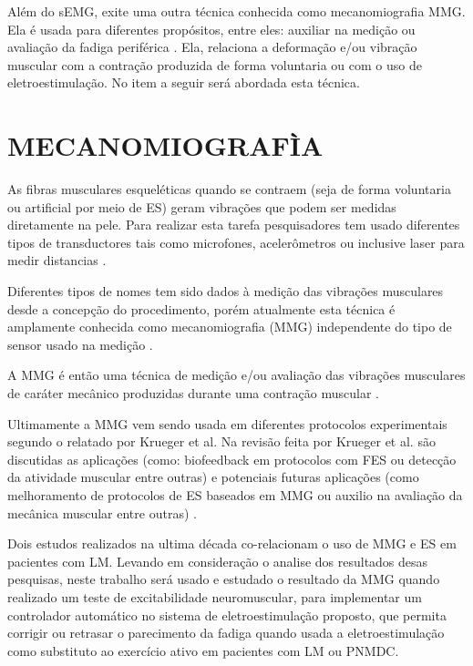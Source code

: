 Além do \acrshort{sEMG}, exite uma outra técnica conhecida como mecanomiografia \acrshort{MMG}. Ela é usada para diferentes propósitos, entre eles: auxiliar na medição ou avaliação da fadiga periférica \cite{Tarata2003MechanomyographyFatigue.}. Ela, relaciona a deformação e/ou vibração muscular com a contração produzida de forma voluntaria ou com o uso de eletroestimulação. No item a seguir será abordada esta técnica. 


\section{MECANOMIOGRAFÌA}
As fibras musculares esqueléticas quando se contraem (seja de forma voluntaria ou artificial por meio de \acrshort{ES}) geram vibrações que podem ser medidas diretamente na pele. Para realizar esta tarefa pesquisadores tem usado diferentes tipos de transductores tais como microfones, acelerômetros ou inclusive laser para medir distancias \cite{Akataki1999RelationshipDecomposition}. 

Diferentes tipos de nomes tem sido dados à medição das vibrações musculares desde a concepção do procedimento, porém atualmente esta técnica é amplamente conhecida como mecanomiografia (\acrshort{MMG}) independente do tipo de sensor usado na medição \cite{Vaz1999AMuscular, Jotta2015CharacterizationContractions}. 

A \acrshort{MMG} é então uma técnica de medição e/ou avaliação das vibrações musculares de caráter mecânico produzidas durante uma contração muscular \cite{Akataki1999RelationshipDecomposition}. 

Ultimamente a \acrshort{MMG} vem sendo usada em diferentes protocolos experimentais segundo o relatado por Krueger et al. Na revisão feita por Krueger et al. são discutidas as aplicações (como: biofeedback em protocolos com \acrshort{FES} ou detecção da atividade muscular entre outras) e potenciais futuras aplicações (como melhoramento de protocolos de \acrshort{ES} baseados em \acrshort{MMG} ou auxilio na avaliação da mecânica muscular entre outras) \cite{Krueger2014AdvancesMechanomyography}.

Dois estudos realizados na ultima década co-relacionam o uso de \acrshort{MMG} e \acrshort{ES} em pacientes com \acrshort{LM}. Levando em consideração o analise dos resultados desas pesquisas, neste trabalho será usado e estudado o resultado da \acrshort{MMG} quando realizado um teste de excitabilidade neuromuscular, para implementar um controlador automático no sistema de eletroestimulação  proposto, que permita corrigir ou retrasar o parecimento da fadiga quando usada a eletroestimulação como substituto ao exercício ativo em pacientes com \acrshort{LM} ou \acrshort{PNMDC}.

